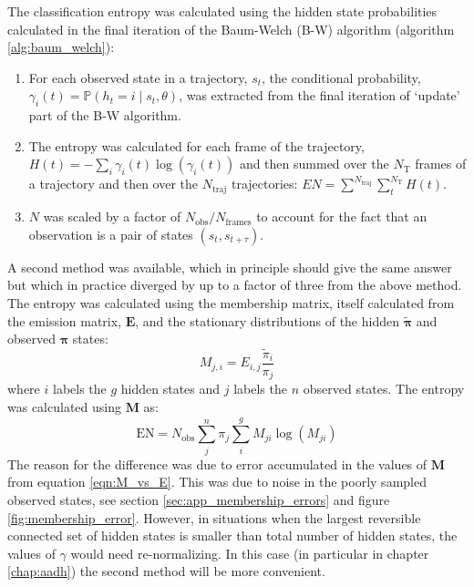 The classification entropy was calculated using the hidden state probabilities calculated in the final iteration of the Baum-Welch (B-W) algorithm (algorithm \ref{alg:baum_welch}): 
\begin{enumerate}
    \item For each observed state in a trajectory, $s_t$, the conditional probability, $\gamma_{i}(t)=\mathbb{P}\left(h_{t}=i \mid s_t, \theta\right)$, was extracted from the final iteration of `update' part of the B-W algorithm. 
    \item The entropy was calculated for each frame of the trajectory,  $H(t)=-\sum_{i}\gamma_{i}(t)\log{\left(\gamma_{i}(t)\right)}$ and then summed over the $N_{\mathrm{T}}$ frames of a trajectory and then over the $N_{\mathrm{traj}}$ trajectories: $EN = \sum^{N_{\mathrm{traj}}} \sum_{t}^{N_{\mathrm{T}}} H(t)$.
    \item $N$ was scaled by a factor of $N_{\mathrm{obs}}/N_{\mathrm{frames}}$ to account for the fact that an observation is a pair of states $(s_{t}, s_{t+\tau})$.
\end{enumerate}
A second method was available, which in principle should give the same answer but which in practice diverged by up to a factor of three from the above method. The entropy was calculated using the membership matrix, itself calculated from the emission matrix, $\mathbf{E}$, and the stationary distributions of the hidden $\widetilde{\bm{\pi}}$ and observed $\bm{\pi}$ states: 
\begin{equation}\label{eqn:M_vs_E}
    M_{j,i} = E_{i,j}\frac{\widetilde{\pi}_{i}}{\pi_{j}}
\end{equation}
where $i$ labels the $g$ hidden states and $j$ labels the $n$ observed states. The entropy was calculated using $\mathbf{M}$ as: 
\begin{equation}\label{eqn:ent_v2}
    \mathrm{EN} = N_{\mathrm{obs}}\sum^{n}_{j}\pi_{j}\sum^{g}_{i} M_{ji}\log{\left(M_{ji}\right)}
\end{equation}
The reason for the difference was due to error accumulated in the values of  $\mathbf{M}$ from equation \ref{eqn:M_vs_E}. This was due to noise in the poorly sampled observed states, see section \ref{sec:app_membership_errors} and figure \ref{fig:membership_error}. However, in situations when the largest reversible connected set of hidden states is smaller than total number of hidden states, the values of $\gamma$ would need re-normalizing. In this case (in particular in chapter \ref{chap:aadh}) the second method will be more convenient. 

